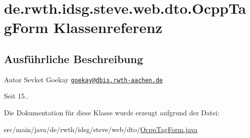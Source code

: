 \hypertarget{classde_1_1rwth_1_1idsg_1_1steve_1_1web_1_1dto_1_1_ocpp_tag_form}{\section{de.\+rwth.\+idsg.\+steve.\+web.\+dto.\+Ocpp\+Tag\+Form Klassenreferenz}
\label{classde_1_1rwth_1_1idsg_1_1steve_1_1web_1_1dto_1_1_ocpp_tag_form}
}


\subsection{Ausführliche Beschreibung}
\begin{DoxyAuthor}{Autor}
Sevket Goekay \href{mailto:goekay@dbis.rwth-aachen.de}{\tt goekay@dbis.\+rwth-\/aachen.\+de} 
\end{DoxyAuthor}
\begin{DoxySince}{Seit}
15.. 
\end{DoxySince}


Die Dokumentation für diese Klasse wurde erzeugt aufgrund der Datei\+:\begin{DoxyCompactItemize}
\item 
src/main/java/de/rwth/idsg/steve/web/dto/\hyperlink{_ocpp_tag_form_8java}{Ocpp\+Tag\+Form.\+java}\end{DoxyCompactItemize}
